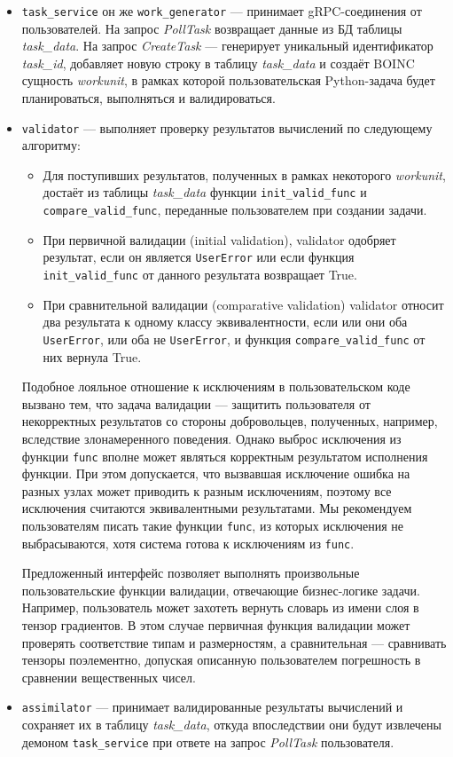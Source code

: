 \documentclass[a4paper,12pt]{extarticle}
\begin{document}
\begin{itemize}
    \item \texttt{task\_service} он же \texttt{work\_generator} — принимает gRPC-соединения от пользователей. На запрос \textit{PollTask} возвращает данные из БД таблицы \textit{task\_data}. На запрос \textit{CreateTask} — генерирует уникальный идентификатор \textit{task\_id}, добавляет новую строку в таблицу \textit{task\_data} и создаёт BOINC сущность \textit{workunit}, в рамках которой пользовательская Python-задача будет планироваться, выполняться и валидироваться.

    \item \texttt{validator} — выполняет проверку результатов вычислений по следующему алгоритму:
    \begin{itemize}
        \item Для поступивших результатов, полученных в рамках некоторого \textit{workunit}, достаёт из таблицы \textit{task\_data} функции \texttt{init\_valid\_func} и \texttt{compare\_valid\_func}, переданные пользователем при создании задачи.
        \item При первичной валидации (initial validation), validator одобряет результат, если он является \texttt{UserError} или если функция \texttt{init\_valid\_func} от данного результата возвращает True.
        \item При сравнительной валидации (comparative validation) validator относит два результата к одному классу эквивалентности, если или они оба \texttt{UserError}, или оба не \texttt{UserError}, и функция \texttt{compare\_valid\_func} от них вернула True.
    \end{itemize}

    Подобное лояльное отношение к исключениям в пользовательском коде вызвано тем, что задача валидации — защитить пользователя от некорректных результатов со стороны добровольцев, полученных, например, вследствие злонамеренного поведения.
    Однако выброс исключения из функции \texttt{func} вполне может являться корректным результатом исполнения функции.
    При этом допускается, что вызвавшая исключение ошибка на разных узлах может приводить к разным исключениям, поэтому все исключения считаются эквивалентными результатами.
    Мы рекомендуем пользователям писать такие функции \texttt{func}, из которых исключения не выбрасываются, хотя система готова к исключениям из \texttt{func}.

    Предложенный интерфейс позволяет выполнять произвольные пользовательские функции валидации, отвечающие бизнес-логике задачи. Например, пользователь может захотеть вернуть словарь из имени слоя в тензор градиентов. В этом случае первичная функция валидации может проверять соответствие типам и размерностям, а сравнительная — сравнивать тензоры поэлементно, допуская описанную пользователем погрешность в сравнении вещественных чисел.

    \item \texttt{assimilator} — принимает валидированные результаты вычислений и сохраняет их в таблицу \textit{task\_data}, откуда впоследствии они будут извлечены демоном \texttt{task\_service} при ответе на запрос \textit{PollTask} пользователя.
\end{itemize}
\end{document}
